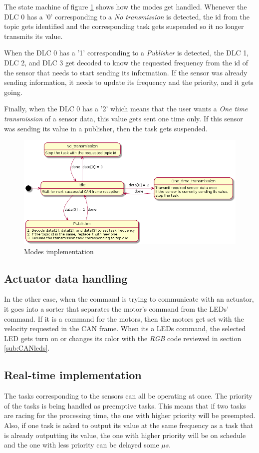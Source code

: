 \documentclass[12pt]{report}%
\begin{document}
The state machine of figure \ref{fig:states} shows how the modes get handled. Whenever the DLC 0 has a '0' corresponding to a \textit{No transmission} is detected, the id from the topic gets identified and the corresponding task gets suspended so it no longer transmits its value.

When the DLC 0 has a '1' corresponding to a \textit{Publisher} is detected, the DLC 1, DLC 2, and DLC 3 get decoded to know the requested frequency from the id of the sensor that needs to start sending its information. If the sensor was already sending information, it needs to update its frequency and the priority, and it gets going.

Finally, when the DLC 0 has a '2' which means that the user wants a \textit{One time transmission} of a sensor data, this value gets sent one time only. If this sensor was sending its value in a publisher, then the task gets suspended.

\begin{figure}[ht]
 \centering
 \includegraphics[width=\textwidth]{states}
		\caption{Modes implementation}
		\label{fig:states}
\end{figure}

\subsection{Actuator data handling}
In the other case, when the command is trying to communicate with an actuator, it goes into a sorter that separates the motor's command from the LEDs' command. If it is a command for the motors, then the motors get set with the velocity requested in the CAN frame. When its a LEDs command, the selected LED gets turn on or changes its color with the \textit{RGB} code reviewed in section \ref{sub:CANleds}.

\subsection{Real-time implementation}
The tasks corresponding to the sensors can all be operating at once. The priority of the tasks is being handled as preemptive tasks. This means that if two tasks are racing for the processing time, the one with higher priority will be preempted. Also, if one task is asked to output its value at the same frequency as a task that is already outputting its value, the one with higher priority will be on schedule and the one with less priority can be delayed some $\mu s$.
\end{document}
